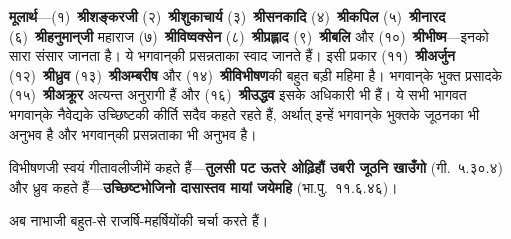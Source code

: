 \begin{sloppypar}\justifying{}
\textbf{मूलार्थ}—(१)~\textbf{श्रीशङ्करजी} (२)~\textbf{श्रीशुकाचार्य} (३)~\textbf{श्रीसनकादि} (४)~\textbf{श्रीकपिल} (५)~\textbf{श्रीनारद} (६)~\textbf{श्रीहनुमान्‌जी} महाराज (७)~\textbf{श्रीविष्वक्सेन} (८)~\textbf{श्रीप्रह्लाद} (९)~\textbf{श्रीबलि} और (१०)~\textbf{श्रीभीष्म}—इनको सारा संसार जानता है। ये भगवान्‌की प्रसन्नताका स्वाद जानते हैं। इसी प्रकार (११)~\textbf{श्रीअर्जुन} (१२)~\textbf{श्रीध्रुव} (१३)~\textbf{श्रीअम्बरीष} और (१४)~\textbf{श्रीविभीषण}की बहुत बड़ी महिमा है। भगवान्‌के भुक्त प्रसादके (१५)~\textbf{श्रीअक्रूर} अत्यन्त अनुरागी हैं और (१६)~\textbf{श्रीउद्धव} इसके अधिकारी भी हैं। ये सभी भागवत भगवान्‌के नैवेद्यके उच्छिष्टकी कीर्ति सदैव कहते रहते हैं, अर्थात् इन्हें भगवान्‌के भुक्तके जूठनका भी अनुभव है और भगवान्‌की प्रसन्नताका भी अनुभव है।
\end{sloppypar}
\begin{sloppypar}\justifying{}
विभीषणजी स्वयं गीतावलीजीमें कहते हैं—\textbf{तुलसी पट ऊतरे ओढ़िहौं उबरी जूठनि खाउँगो} (गी.~५.३०.४) और ध्रुव कहते हैं—\textbf{उच्छिष्टभोजिनो दासास्तव मायां जयेमहि} (भा.पु.~११.६.४६)।
\end{sloppypar}
\begin{sloppypar}\justifying{}
अब नाभाजी बहुत-से राजर्षि-महर्षियोंकी चर्चा करते हैं।
\end{sloppypar}


